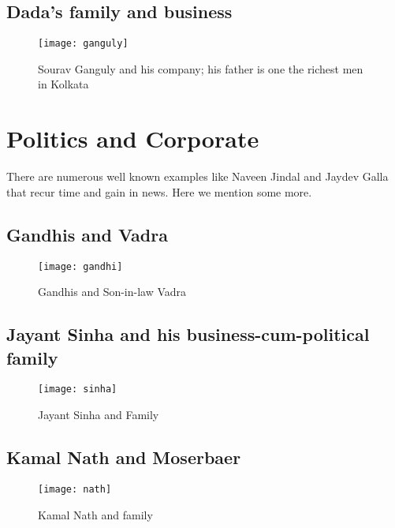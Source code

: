 \subsection{Dada's family and business}

\begin{figure}[H]
\begin{center}  
\texttt{[image: ganguly]} 
\caption{Sourav Ganguly and his company; his father is one the richest men in Kolkata}
\label{fig:ganguly}
\end{center}
\end{figure}



\section{Politics and Corporate}

There are numerous well known examples like Naveen Jindal and Jaydev Galla that recur time and gain in news. Here we mention some more.

\subsection{Gandhis and Vadra}

\begin{figure}[H]
\begin{center}  
\texttt{[image: gandhi]} 
\caption{Gandhis and Son-in-law Vadra}
\label{fig:gandhi}
\end{center}
\end{figure}

\subsection{Jayant Sinha and his business-cum-political family}

\begin{figure}[H]
\begin{center}  
\texttt{[image: sinha]} 
\caption{Jayant Sinha and Family}
\label{fig:sinha}
\end{center}
\end{figure}

\subsection{Kamal Nath and Moserbaer}

\begin{figure}[H]
\begin{center}  
\texttt{[image: nath]} 
\caption{Kamal Nath and family}
\label{fig:nath}
\end{center}
\end{figure}